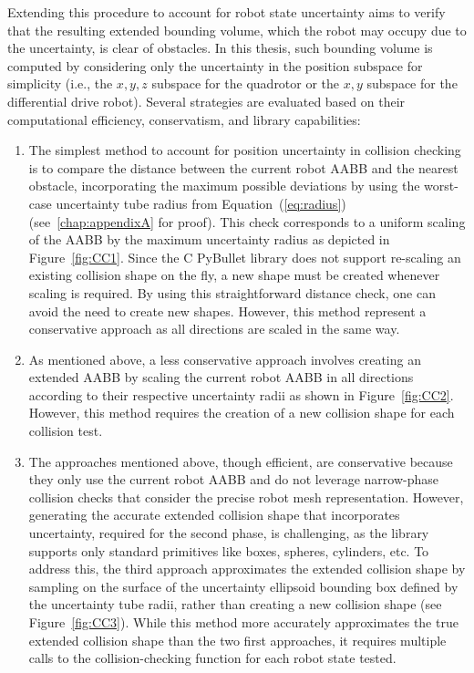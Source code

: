 Extending this procedure to account for robot state uncertainty aims to verify that the resulting extended bounding volume, which the robot may occupy due to the uncertainty, is clear of obstacles.
In this thesis, such bounding volume is computed by considering only the uncertainty in the position subspace for simplicity (i.e., the $x,y,z$ subspace for the quadrotor or the $x,y$ subspace for the differential drive robot).
Several strategies are evaluated based on their computational efficiency, conservatism, and library capabilities:
\begin{enumerate}
    \item The simplest method to account for position uncertainty in collision checking is to compare the distance between the current robot AABB and the nearest obstacle, incorporating the maximum possible deviations by using the worst-case uncertainty tube radius from Equation~(\ref{eq:radius}) (see~\ref{chap:appendixA} for proof).
    This check corresponds to a uniform scaling of the AABB by the maximum uncertainty radius as depicted in Figure~\ref{fig:CC1}. 
    Since the C PyBullet library does not support re-scaling an existing collision shape on the fly, a new shape must be created whenever scaling is required. 
    By using this straightforward distance check, one can avoid the need to create new shapes.
    However, this method represent a conservative approach as all directions are scaled in the same way.
    \item As mentioned above, a less conservative approach involves creating an extended AABB by scaling the current robot AABB in all directions according to their respective uncertainty radii as shown in Figure~\ref{fig:CC2}. 
    However, this method requires the creation of a new collision shape for each collision test.
    \item The approaches mentioned above, though efficient, are conservative because they only use the current robot AABB and do not leverage narrow-phase collision checks that consider the precise robot mesh representation. 
    However, generating the accurate extended collision shape that incorporates uncertainty, required for the second phase, is challenging, as the library supports only standard primitives like boxes, spheres, cylinders, etc.
    To address this, the third approach approximates the extended collision shape by sampling on the surface of the uncertainty ellipsoid bounding box defined by the uncertainty tube radii, rather than creating a new collision shape (see Figure~\ref{fig:CC3}). 
    While this method more accurately approximates the true extended collision shape than the two first approaches, it requires multiple calls to the collision-checking function for each robot state tested.
\end{enumerate}

